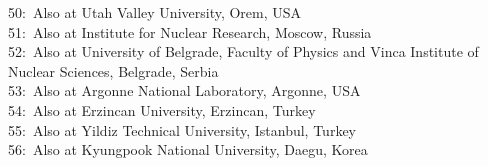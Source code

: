 $$50:~Also at Utah Valley University, Orem, USA\\
51:~Also at Institute for Nuclear Research, Moscow, Russia\\
52:~Also at University of Belgrade, Faculty of Physics and Vinca Institute of Nuclear Sciences, Belgrade, Serbia\\
53:~Also at Argonne National Laboratory, Argonne, USA\\
54:~Also at Erzincan University, Erzincan, Turkey\\
55:~Also at Yildiz Technical University, Istanbul, Turkey\\
56:~Also at Kyungpook National University, Daegu, Korea\\

